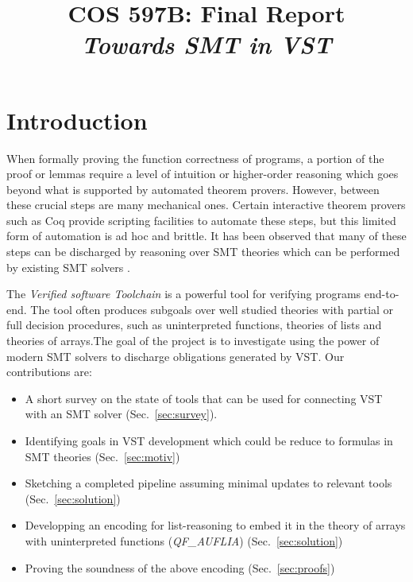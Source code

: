 \documentclass[onecolumn, preprint]{sigplanconf}
\title{COS 597B: Final Report\\
\emph{Towards SMT in VST}}
\begin{document}
\maketitle


\section{Introduction}
When formally proving the function correctness of programs, a portion of the proof or lemmas require a level of intuition or higher-order reasoning which goes beyond what is supported by automated theorem provers. However, between these crucial steps are many mechanical ones. Certain interactive theorem provers such as Coq provide scripting facilities to automate these steps, but this limited form of automation is ad hoc and brittle. It has been observed that many of these steps can be discharged by reasoning over SMT theories which can be performed by existing SMT solvers \citep{appelnote}. 

The \emph{Verified software Toolchain} is a powerful tool for verifying programs end-to-end. %
The tool often produces subgoals over well studied theories with partial or full decision procedures, such as uninterpreted functions, theories of lists and theories of arrays.The goal of the project is to investigate using the power of modern SMT solvers to discharge obligations generated by VST. Our contributions are:
\begin{itemize}
\item A short survey on the state of tools that can be used for connecting VST with an SMT solver (Sec.~\ref{sec:survey}). %
 \item Identifying goals in VST development which could be reduce to formulas in SMT theories (Sec.~\ref{sec:motiv})
 \item Sketching a completed pipeline assuming minimal updates to relevant tools (Sec.~\ref{sec:solution})
 \item Developping an encoding for list-reasoning to embed it in the theory of arrays with uninterpreted functions (\emph{QF\_AUFLIA}) (Sec.~\ref{sec:solution})
 \item Proving the soundness of the above encoding (Sec.~\ref{sec:proofs})
\end{itemize}
\end{document}
